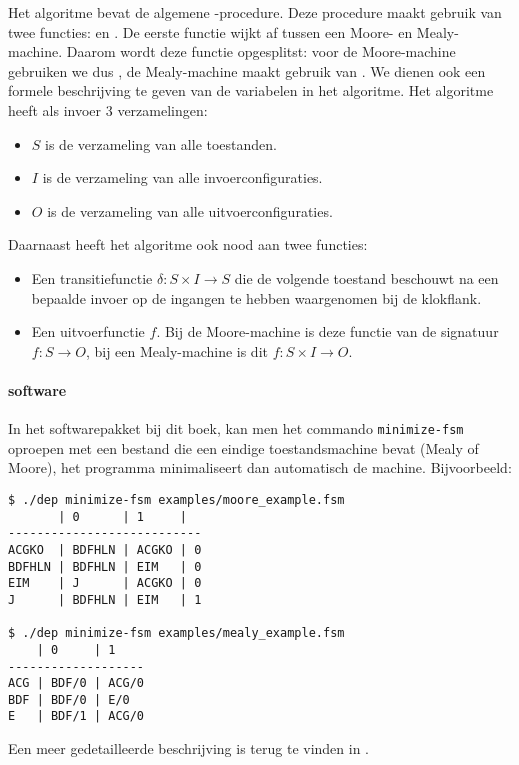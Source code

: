 Het algoritme bevat de algemene -procedure. Deze procedure maakt gebruik van twee functies:  en . De eerste functie wijkt af tussen een Moore- en Mealy-machine. Daarom wordt deze functie opgesplitst: voor de Moore-machine gebruiken we dus , de Mealy-machine maakt gebruik van . We dienen ook een formele beschrijving te geven van de variabelen in het algoritme. Het algoritme heeft als invoer 3 verzamelingen:
\begin{itemize}
 \item $S$ is de verzameling van alle toestanden.
 \item $I$ is de verzameling van alle invoerconfiguraties.
 \item $O$ is de verzameling van alle uitvoerconfiguraties.
\end{itemize}
Daarnaast heeft het algoritme ook nood aan twee functies:
\begin{itemize}
 \item Een transitiefunctie $\delta:S\times I\rightarrow S$ die de volgende toestand beschouwt na een bepaalde invoer op de ingangen te hebben waargenomen bij de klokflank.
 \item Een uitvoerfunctie $f$. Bij de Moore-machine is deze functie van de signatuur $f:S\rightarrow O$, bij een Mealy-machine is dit $f:S\times I\rightarrow O$.
\end{itemize}

\paragraph{software}
In het softwarepakket bij dit boek, kan men het commando \verb+minimize-fsm+ oproepen met een bestand die een eindige toestandsmachine bevat (Mealy of Moore), het programma minimaliseert dan automatisch de machine. Bijvoorbeeld:

\begin{verbatim}
$ ./dep minimize-fsm examples/moore_example.fsm
       | 0      | 1     |
---------------------------
ACGKO  | BDFHLN | ACGKO | 0
BDFHLN | BDFHLN | EIM   | 0
EIM    | J      | ACGKO | 0
J      | BDFHLN | EIM   | 1

$ ./dep minimize-fsm examples/mealy_example.fsm
    | 0     | 1
-------------------
ACG | BDF/0 | ACG/0
BDF | BDF/0 | E/0
E   | BDF/1 | ACG/0
\end{verbatim}


Een meer gedetailleerde beschrijving is terug te vinden in .



